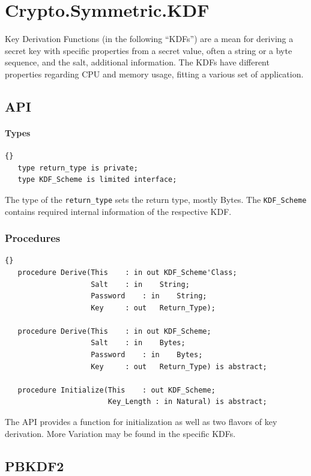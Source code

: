 \chapter{Crypto.Symmetric.KDF}
Key Derivation Functions (in the following “KDFs”) are a mean for deriving a secret key with specific properties from a secret value, often a string or a byte sequence, and the salt, additional information. The KDFs have different properties regarding CPU and memory usage, fitting a various set of application.
\section{API}
\subsubsection*{Types}
\begin{lstlisting}{}
   type return_type is private;
   type KDF_Scheme is limited interface;
\end{lstlisting}
The type of the \texttt{return\_type} sets the return type, mostly Bytes. The \texttt{KDF\_Scheme} contains required internal information of the respective KDF.
\subsection*{Procedures}
\begin{lstlisting}{}
   procedure Derive(This	: in out KDF_Scheme'Class;
                    Salt	: in 	String;
                    Password	: in	String;
                    Key		: out	Return_Type);

   procedure Derive(This	: in out KDF_Scheme;
                    Salt	: in 	Bytes;
                    Password	: in	Bytes;
                    Key		: out	Return_Type) is abstract;

   procedure Initialize(This	: out KDF_Scheme;
                        Key_Length : in Natural) is abstract;

\end{lstlisting}
The API provides a function for initialization as well as two flavors of key derivation. More Variation may be found in the specific KDFs. 

\section{PBKDF2}

